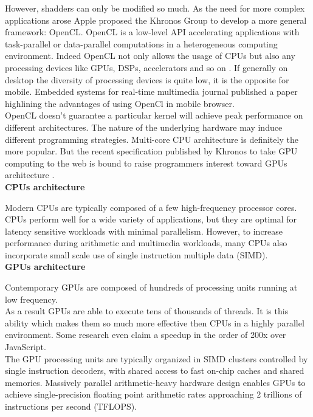 However, shadders can only be modified so much. As the need for more complex
applications arose Apple proposed the Khronos Group to develop a more general
framework: OpenCL. OpenCL is a low-level API accelerating applications with
task-parallel or data-parallel computations in a heterogeneous computing
environment. Indeed OpenCL not only allows the usage of CPUs but also any
processing devices like GPUs, DSPs, accelerators and so on \citep{Reference5}.
If generally on desktop the diversity of processing devices is quite low, it is
the opposite for mobile. Embedded systems for real-time multimedia journal
published a paper \citep{Reference3} highlining the advantages of using OpenCl
in mobile browser.\\

OpenCL doesn't guarantee a particular kernel will achieve peak performance on
different architectures. The nature of the underlying hardware may induce
different programming strategies. Multi-core CPU architecture is definitely the
more popular. But the recent specification published by Khronos to take GPU
computing to the web is bound to raise programmers interest toward GPUs
architecture \citep{Reference30}.\\ 

\textbf{CPUs architecture}

Modern CPUs are typically composed of a few high-frequency processor cores.
CPUs perform well for a wide variety of applications, but they are optimal for
latency sensitive workloads with minimal parallelism. However, to increase
performance during arithmetic and multimedia workloads,  many CPUs also
incorporate small scale use of single instruction multiple data (SIMD).\\

\textbf{GPUs architecture}

Contemporary GPUs are composed of hundreds of processing units running at low
frequency. \\

As a result GPUs are able to execute tens of thousands of threads. It is this
ability which makes them so much more effective then CPUs in a highly parallel
environment. Some research even claim a speedup in the order of 200x over
JavaScript. \citep{Reference3}\\

The GPU processing units are typically organized in SIMD clusters controlled by
single instruction decoders, with shared access to fast on-chip caches and
shared memories. Massively parallel arithmetic-heavy hardware design enables
GPUs to achieve single-precision floating point arithmetic rates approaching 2
trillions of instructions per second (TFLOPS). \citep{Reference5}\\

